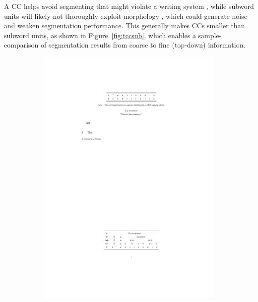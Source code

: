A CC helps avoid segmenting that might violate a writing system \cite{Limcharoen2009}, while subword units will likely not thoroughly exploit morphology \cite{provilkov-etal-2020-bpe}, which could generate noise and weaken segmentation performance. 
%
This generally makes CCs smaller than subword units, as shown in Figure~\ref{fig:tccsub}, which enables a sample-comparison of segmentation results from coarse to fine (top-down) information.
%
\begin{figure}
    \centering
    \begin{subfigure}{0.49\textwidth}
        \centering
        \includegraphics[width=\textwidth]{figures/fig-tccsub.pdf}
    \end{subfigure}
    \hspace{\textwidth}
    \begin{subfigure}{0.24\textwidth}
        \centering

\end{subfigure}
\end{figure}
